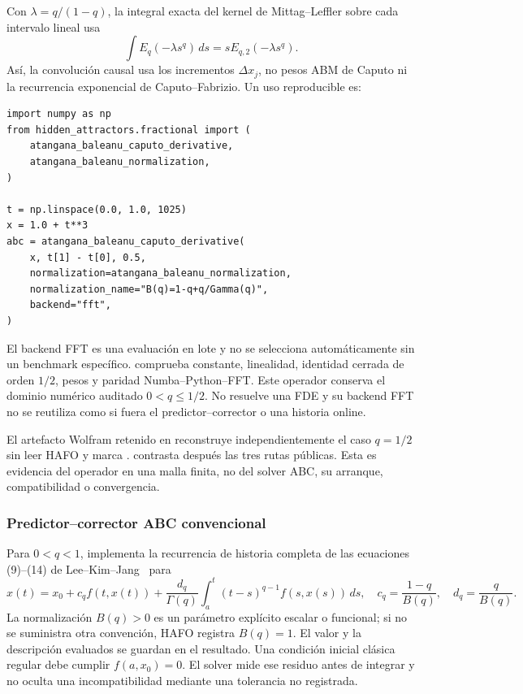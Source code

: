 Con \(\lambda=q/(1-q)\), la integral exacta del kernel de Mittag--Leffler
sobre cada intervalo lineal usa
\[
 \int E_q(-\lambda s^q)\,ds
 =sE_{q,2}(-\lambda s^q).
\]
Así, la convolución causal usa los incrementos \(\Delta x_j\), no pesos ABM
de Caputo ni la recurrencia exponencial de Caputo--Fabrizio. Un uso reproducible
es:
\begin{verbatim}
import numpy as np
from hidden_attractors.fractional import (
    atangana_baleanu_caputo_derivative,
    atangana_baleanu_normalization,
)

t = np.linspace(0.0, 1.0, 1025)
x = 1.0 + t**3
abc = atangana_baleanu_caputo_derivative(
    x, t[1] - t[0], 0.5,
    normalization=atangana_baleanu_normalization,
    normalization_name="B(q)=1-q+q/Gamma(q)",
    backend="fft",
)
\end{verbatim}
El backend FFT es una evaluación en lote y no se selecciona automáticamente
sin un benchmark específico. 
comprueba constante, linealidad, identidad cerrada de orden \(1/2\), pesos y
paridad Numba--Python--FFT. Este operador conserva el dominio numérico auditado
\(0<q\le1/2\). No resuelve una FDE y su backend FFT no se reutiliza como si
fuera el predictor--corrector o una historia online.

El artefacto Wolfram retenido en
 reconstruye
independientemente el caso \(q=1/2\) sin leer HAFO y marca
. 
contrasta después las tres rutas públicas. Esta es evidencia del operador en
una malla finita, no del solver ABC, su arranque, compatibilidad o convergencia.

\subsubsection{Predictor--corrector ABC convencional}

Para \(0<q<1\),  implementa la
recurrencia de historia completa de las ecuaciones (9)--(14) de
Lee--Kim--Jang~\cite{LeeKimJang2024} para
\[
 x(t)=x_0+c_q f(t,x(t))+
 \frac{d_q}{\Gamma(q)}\int_a^t(t-s)^{q-1}f(s,x(s))\,ds,
 \quad c_q=\frac{1-q}{B(q)},\quad d_q=\frac{q}{B(q)}.
\]
La normalización \(B(q)>0\) es un parámetro explícito escalar o funcional; si no
se suministra otra convención, HAFO registra \(B(q)=1\). El valor y la
descripción evaluados se guardan en el resultado. Una condición inicial clásica
regular debe cumplir \(f(a,x_0)=0\). El solver mide ese residuo antes de integrar
y no oculta una incompatibilidad mediante una tolerancia no registrada.

